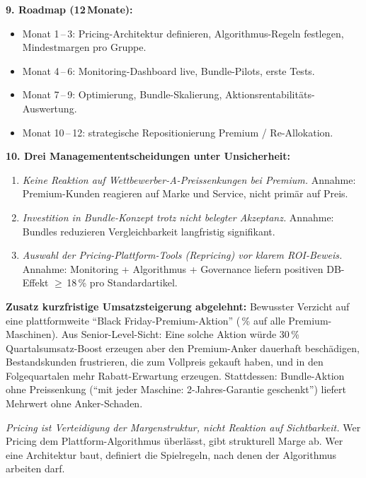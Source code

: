 \documentclass[11pt,a4paper,oneside]{article}
\begin{document}
\begin{loesungbox}
\textbf{9. Roadmap (12\,Monate):}
\begin{itemize}
  \item Monat 1\,--\,3: Pricing-Architektur definieren, Algorithmus-Regeln festlegen, Mindestmargen pro Gruppe.
  \item Monat 4\,--\,6: Monitoring-Dashboard live, Bundle-Pilots, erste Tests.
  \item Monat 7\,--\,9: Optimierung, Bundle-Skalierung, Aktionsrentabilitäts-Auswertung.
  \item Monat 10\,--\,12: strategische Repositionierung Premium / Re-Allokation.
\end{itemize}

\textbf{10. Drei Managemententscheidungen unter Unsicherheit:}
\begin{enumerate}
  \item \emph{Keine Reaktion auf Wettbewerber-A-Preissenkungen bei Premium.} Annahme: Premium-Kunden reagieren auf Marke und Service, nicht primär auf Preis.
  \item \emph{Investition in Bundle-Konzept trotz nicht belegter Akzeptanz.} Annahme: Bundles reduzieren Vergleichbarkeit langfristig signifikant.
  \item \emph{Auswahl der Pricing-Plattform-Tools (Repricing) vor klarem ROI-Beweis.} Annahme: Monitoring + Algorithmus + Governance liefern positiven DB-Effekt $\geq$\,18\,\% pro Standardartikel.
\end{enumerate}

\textbf{Zusatz \textendash{} kurzfristige Umsatzsteigerung abgelehnt:}
Bewusster Verzicht auf eine plattformweite ``Black Friday-Premium-Aktion'' (\,\% auf alle Premium-Maschinen). Aus Senior-Level-Sicht: Eine solche Aktion würde 30\,\% Quartalsumsatz-Boost erzeugen \textendash{} aber den Premium-Anker dauerhaft beschädigen, Bestandskunden frustrieren, die zum Vollpreis gekauft haben, und in den Folgequartalen mehr Rabatt-Erwartung erzeugen. Stattdessen: Bundle-Aktion ohne Preissenkung (``mit jeder Maschine: 2-Jahres-Garantie geschenkt'') \textendash{} liefert Mehrwert ohne Anker-Schaden.

\begin{merkbox}
\emph{Pricing ist Verteidigung der Margenstruktur, nicht Reaktion auf Sichtbarkeit.} Wer Pricing dem Plattform-Algorithmus überlässt, gibt strukturell Marge ab. Wer eine Architektur baut, definiert die Spielregeln, nach denen der Algorithmus arbeiten darf.
\end{merkbox}
\end{loesungbox}
\end{document}
